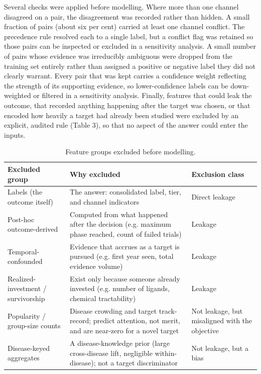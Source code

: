 \documentclass[11pt,twocolumn]{article}
\begin{document}
Several checks were applied before modelling. Where more than one channel disagreed on a pair, the disagreement was recorded rather than hidden. A small fraction of pairs (about six per cent) carried at least one channel conflict. The precedence rule resolved each to a single label, but a conflict flag was retained so those pairs can be inspected or excluded in a sensitivity analysis. A small number of pairs whose evidence was irreducibly ambiguous were dropped from the training set entirely rather than assigned a positive or negative label they did not clearly warrant. Every pair that was kept carries a confidence weight reflecting the strength of its supporting evidence, so lower-confidence labels can be down-weighted or filtered in a sensitivity analysis. Finally, features that could leak the outcome, that recorded anything happening after the target was chosen, or that encoded how heavily a target had already been studied were excluded by an explicit, audited rule (Table 3), so that no aspect of the answer could enter the inputs.

\begin{table}[t]
\centering
\caption{Feature groups excluded before modelling.}
\label{tab:3}
\footnotesize
\begin{tabular}{p{}p{}p{}}
\toprule
Excluded group & Why excluded & Exclusion class \\
\midrule
Labels (the outcome itself) & The answer: consolidated label, tier, and channel indicators & Direct leakage \\
Post-hoc outcome-derived & Computed from what happened after the decision (e.g. maximum phase reached, count of failed trials) & Leakage \\
Temporal-confounded & Evidence that accrues as a target is pursued (e.g. first year seen, total evidence volume) & Leakage \\
Realized-investment / survivorship & Exist only because someone already invested (e.g. number of ligands, chemical tractability) & Leakage \\
Popularity / group-size counts & Disease crowding and target track-record; predict attention, not merit, and are near-zero for a novel target & Not leakage, but misaligned with the objective \\
Disease-keyed aggregates & A disease-knowledge prior (large cross-disease lift, negligible within-disease); not a target discriminator & Not leakage, but a bias \\
\bottomrule
\end{tabular}
\end{table}
\end{document}
